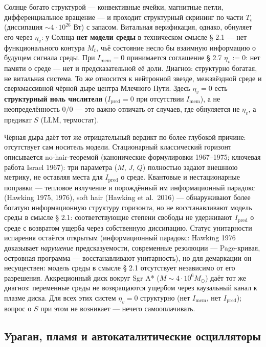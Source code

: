 \documentclass[pdflatex,sn-mathphys-ay]{sn-jnl}
\begin{document}
Солнце богато структурой --- конвективные ячейки, магнитные петли, дифференциальное вращение --- и проходит структурный скрининг по части \(T_v\) (диссипация \(\sim 4 \cdot 10^{26}\) Вт) с запасом. Витальная верификация, однако, обнуляет его через \(\eta_v\): у Солнца \textbf{нет модели среды} в техническом смысле § 2.1 --- нет функционального контура \(M_t\), чьё состояние несло бы взаимную информацию о будущем сигнала среды. При \(I_{\text{mem}} = 0\) принимается соглашение § 2.7 \(\eta_v := 0\): нет памяти о среде --- нет и предсказательной её доли. Диагноз: структурно богатая, не витальная система. То же относится к нейтронной звезде, межзвёздной среде и сверхмассивной чёрной дыре центра Млечного Пути. Здесь \(\eta_v = 0\) есть \textbf{структурный ноль числителя} (\(I_{\text{pred}} = 0\) при отсутствии \(I_{\text{mem}}\)), а не неопределённость \(0/0\) --- это важно отличать от случаев, где обнуляется не \(\eta_v\), а предикат \(S\) (LLM, термостат).

Чёрная дыра даёт тот же отрицательный вердикт по более глубокой причине: отсутствует сам носитель модели. Стационарный классический горизонт описывается no-hair-теоремой (канонические формулировки 1967--1975; ключевая работа Israel 1967): три параметра (\(M\), \(J\), \(Q\)) полностью задают внешнюю метрику, не оставляя места для \(I_{\text{pred}}\) о среде. Квантовые и нестационарные поправки --- тепловое излучение и порождённый им информационный парадокс (Hawking 1975, 1976), soft hair (Hawking et al.~2016) --- обнаруживают более богатую информационную структуру горизонта, но не восстанавливают модель среды в смысле § 2.1: соответствующие степени свободы не удерживают \(I_{\text{pred}}\) о среде с возвратом ущерба через собственную диссипацию. Статус унитарности испарения остаётся открытым (информационный парадокс: Hawking 1976 доказывает \emph{нарушение} предсказуемости, современные резолюции --- Page-кривая, островная программа --- восстанавливают унитарность), но для демаркации он несуществен: модель среды в смысле § 2.1 отсутствует независимо от его разрешения. Аккреционный диск вокруг Sgr A* (\(M \sim 4 \cdot 10^6 M_\odot\)) даёт тот же диагноз: переменные среды не возвращаются ущербом через каузальный канал к плазме диска. Для всех этих систем \(\eta_v = 0\) структурно (нет \(I_{\text{mem}}\), нет \(I_{\text{pred}}\)); вопрос о \(S\) при этом не возникает --- нечего самооплачивать.

\subsection{Ураган, пламя и автокаталитические осцилляторы}\label{ux443ux440ux430ux433ux430ux43d-ux43fux43bux430ux43cux44f-ux438-ux430ux432ux442ux43eux43aux430ux442ux430ux43bux438ux442ux438ux447ux435ux441ux43aux438ux435-ux43eux441ux446ux438ux43bux43bux44fux442ux43eux440ux44b}
\end{document}
